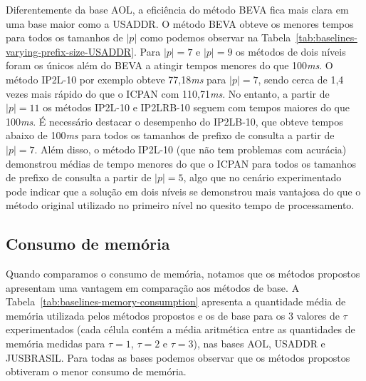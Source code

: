 Diferentemente da base AOL, a eficiência do método BEVA fica mais clara em uma base maior como a USADDR. O método BEVA obteve os menores tempos para todos os tamanhos de $|p|$ como podemos observar na Tabela~\ref{tab:baselines-varying-prefix-size-USADDR}. Para $|p|=7$ e $|p|=9$ os métodos de dois níveis foram os únicos além do BEVA a atingir tempos menores do que 100\textit{ms}. O método IP2L-10 por exemplo obteve 77,18\textit{ms} para $|p|=7$, sendo cerca de 1,4 vezes mais rápido do que o ICPAN com 110,71\textit{ms}. No entanto, a partir de $|p|=11$ os métodos IP2L-10 e IP2LRB-10 seguem com tempos maiores do que 100\textit{ms}. É necessário destacar o desempenho do IP2LB-10, que obteve tempos abaixo de 100\textit{ms} para todos os tamanhos de prefixo de consulta a partir de $|p|=7$. Além disso, o método IP2L-10 (que não tem problemas com acurácia) demonstrou médias de tempo menores do que o ICPAN para todos os tamanhos de prefixo de consulta a partir de $|p|=5$, algo que no cenário experimentado pode indicar que a solução em dois níveis se demonstrou mais vantajosa do que o método original utilizado no primeiro nível no quesito tempo de processamento.

\subsection{Consumo de memória}

Quando comparamos o consumo de memória, notamos que os métodos propostos apresentam uma vantagem em comparação aos métodos de base. A Tabela~\ref{tab:baselines-memory-consumption} apresenta a quantidade média de memória utilizada pelos métodos propostos e os de base para os 3 valores de $\tau$ experimentados (cada célula contém a média aritmética entre as quantidades de memória medidas para $\tau=1$, $\tau=2$ e $\tau=3$), nas bases AOL, USADDR e JUSBRASIL. Para todas as bases podemos observar que os métodos propostos obtiveram o menor consumo de memória. 

